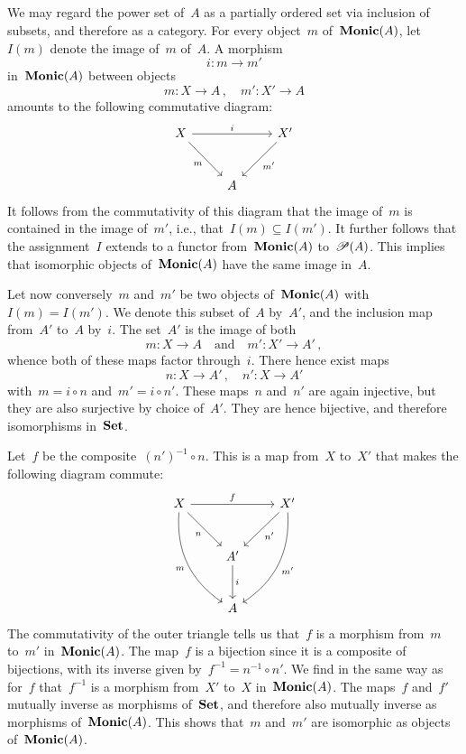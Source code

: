 \subsection{}



\subsubsection{}

We may regard the power set of~$A$ as a partially ordered set via inclusion of subsets, and therefore as a category.
For every object~$m$ of~$\mathbf{Monic}(A)$, let $I(m)$ denote the image of~$m$ of~$A$.
A morphism
\[
	i \colon m \to m'
\]
in~$\mathbf{Monic}(A)$ between objects
\[
	m \colon X \to A \,,
	\quad
	m' \colon X' \to A
\]
amounts to the following commutative diagram:
\[
	\begin{tikzcd}[row sep = large]
		X
		\arrow{rr}[above]{i}
		\arrow{dr}[below left]{m}
		&
		{}
		&
		X'
		\arrow{dl}[below right]{m'}
		\\
		{}
		&
		A
		&
		{}
	\end{tikzcd}
\]
It follows from the commutativity of this diagram that the image of~$m$ is contained in the image of~$m'$, i.e., that~$I(m) ⊆ I(m')$.
It further follows that the assignment~$I$ extends to a functor from~$\mathbf{Monic}(A)$ to~$\mathscr{P}(A)$.
This implies that isomorphic objects of~$\mathbf{Monic}(A)$ have the same image in~$A$.

Let now conversely~$m$ and~$m'$ be two objects of~$\mathbf{Monic}(A)$ with~$I(m) = I(m')$.
We denote this subset of~$A$ by~$A'$, and the inclusion map from~$A'$ to~$A$ by~$i$.
The set~$A'$ is the image of both
\[
	m \colon X \to A
	\quad\text{and}\quad
	m' \colon X' \to A' \,,
\]
whence both of these maps factor through~$i$.
There hence exist maps
\[
	n \colon X \to A' \,,
	\quad
	n' \colon X \to A'
\]
with~$m = i ∘ n$ and~$m' = i ∘ n'$.
These maps~$n$ and~$n'$ are again injective, but they are also surjective by choice of~$A'$.
They are hence bijective, and therefore isomorphisms in~$\mathbf{Set}$.

Let~$f$ be the composite~$(n')^{-1} ∘ n$.
This is a map from~$X$ to~$X'$ that makes the following diagram commute:
\[
	\begin{tikzcd}[row sep = large]
		X
		\arrow{rr}[above]{f}
		\arrow{dr}[below left]{n}
		\arrow[bend right]{ddr}[below left]{m}
		&
		{}
		&
		X'
		\arrow{dl}[below right]{n'}
		\arrow[bend left]{ddl}[below right]{m'}
		\\
		{}
		&
		A'
		\arrow{d}[right]{i}
		&
		{}
		\\
		{}
		&
		A
		&
		{}
	\end{tikzcd}
\]
The commutativity of the outer triangle tells us that~$f$ is a morphism from~$m$ to~$m'$ in~$\mathbf{Monic}(A)$.
The map~$f$ is a bijection since it is a composite of bijections, with its inverse given by~$f^{-1} = n^{-1} ∘ n'$.
We find in the same way as for~$f$ that~$f^{-1}$ is a morphism from~$X'$ to~$X$ in~$\mathbf{Monic}(A)$.
The maps~$f$ and~$f'$ mutually inverse as morphisms of~$\mathbf{Set}$, and therefore also mutually inverse as morphisms of~$\mathbf{Monic}(A)$.
This shows that~$m$ and~$m'$ are isomorphic as objects of~$\mathbf{Monic}(A)$.

